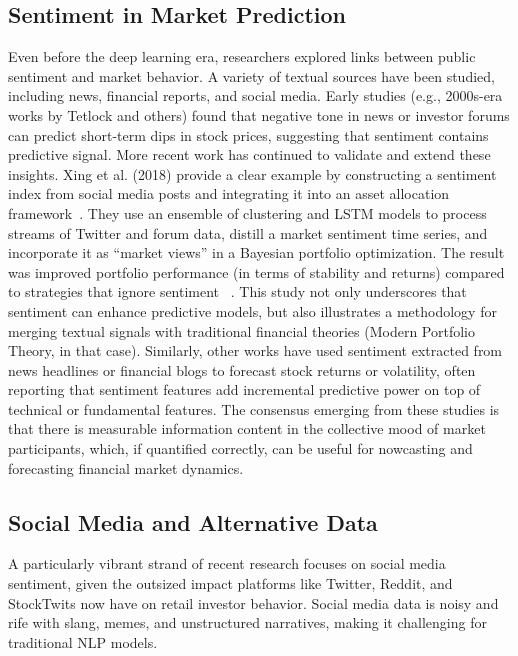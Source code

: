 \documentclass[12pt]{article}
\begin{document}
\subsection{Sentiment in Market Prediction}
Even before the deep learning era, researchers explored links between public sentiment and market behavior.
A variety of textual sources have been studied, including news, financial reports, and
social media. Early studies (e.g., 2000s-era works by Tetlock and others) found that negative tone
in news or investor forums can predict short-term dips in stock prices, suggesting that sentiment contains
predictive signal. More recent work has continued to validate and extend these insights. Xing et al. (2018)
provide a clear example by constructing a sentiment index from social media posts and integrating it into an
asset allocation framework~\cite{10.1109/MCI.2018.2866727}. They use an ensemble of clustering and LSTM
models to process streams of Twitter and forum data, distill a market sentiment time series, and incorporate
it as ``market views'' in a Bayesian portfolio optimization. The result was improved portfolio performance
(in terms of stability and returns) compared to strategies that ignore sentiment~
\cite{10.1109/MCI.2018.2866727}. This study not only underscores that sentiment can enhance predictive
models, but also illustrates a methodology for merging textual signals with traditional financial theories
(Modern Portfolio Theory, in that case). Similarly, other works have used sentiment extracted from news
headlines or financial blogs to forecast stock returns or volatility, often reporting that sentiment features
add incremental predictive power on top of technical or fundamental features. The consensus emerging from
these studies is that there is measurable information content in the collective mood of market participants,
which, if quantified correctly, can be useful for nowcasting and forecasting financial market dynamics.

\subsection{Social Media and Alternative Data}
A particularly vibrant strand of recent research focuses on social media sentiment, given the
outsized impact platforms like Twitter, Reddit, and StockTwits now have on retail investor behavior. Social
media data is noisy and rife with slang, memes, and unstructured narratives, making it challenging for
traditional NLP models.
\end{document}
